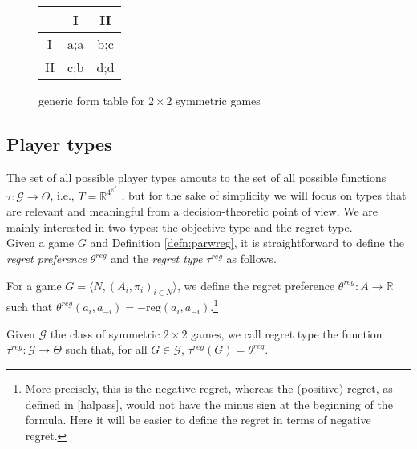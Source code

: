 \documentclass[fleqn,reqno,11pt]{article}
\begin{document}
\begin{figure}
\begin{center}%
\begin{tabular}{|c|c|c|}
\hline 
 & I & II\tabularnewline
\hline 
\hline 
I & a;a & b;c\tabularnewline
\hline 
II & c;b & d;d\tabularnewline
\hline 
\end{tabular}\end{center}

\protect\caption{generic form table for $2 \times 2$ symmetric games}
\label{generic form table}
\end{figure}



\subsection{Player types}

The set of all possible player types amouts to the set of all possible functions $ \tau: \mathcal{G} \rightarrow  \Theta $, i.e., $T=\mathbb{R}^{4^{\mathbb{R}^{4}}} $ , but for the sake of simplicity we will focus on types that are relevant and meaningful from a decision-theoretic point of view. We are mainly interested in two types: the objective type and the regret type.\\
Given a game $G$ and Definition \ref{defn:parwreg}, it is straightforward to define the
\textit{regret preference} $\theta^{reg}$ and the \textit{regret type} $\tau^{reg}$ as
follows. 


\begin{definition} \label{defn:regpref}

For a game $ G=\langle N, (A_i , \pi_i)_{i \in N} \rangle $, we define the regret preference $ \theta^{reg}: A \rightarrow \mathbb{R} $ such that $ \theta^{reg}(a_i,a_{-i})=-\text{reg}(a_i,a_{-i}) $.\footnote{More precisely, this is the negative regret, whereas the (positive) regret, as defined in [halpass], would not have the minus sign at the beginning of the formula. Here it will be easier to define the regret in terms of negative regret.}

\end{definition}



\begin{definition} \label{defn:regtype}

Given $ \mathcal{G} $ the class of symmetric $ 2 \times 2 $ games, we call regret type the function $\tau^{reg}: \mathcal{G} \rightarrow  \Theta$ such that, for all $G \in \mathcal{G}$, $ \tau^{reg}(G)= \theta^{reg}$.

\end{definition}
\end{document}

